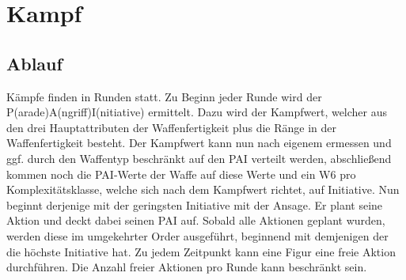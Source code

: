 \documentclass[a4paper,12pt,oneside]{book}
\begin{document}
\part{Kampf}
\setcounter{chapter}{0}
\chapter{Ablauf}

Kämpfe finden in Runden statt. Zu Beginn jeder Runde wird der P(arade)A(ngriff)I(nitiative) ermittelt. Dazu wird der Kampfwert, welcher aus den drei Hauptattributen der Waffenfertigkeit plus die Ränge in der Waffenfertigkeit besteht. Der Kampfwert kann nun nach eigenem ermessen und ggf. durch den Waffentyp beschränkt auf den PAI verteilt werden, abschließend kommen noch die PAI-Werte der Waffe auf diese Werte und ein W6 pro Komplexitätsklasse, welche sich nach dem Kampfwert richtet, auf Initiative. Nun beginnt derjenige mit der geringsten Initiative mit der Ansage. Er plant seine Aktion und deckt dabei seinen PAI auf. Sobald alle Aktionen geplant wurden, werden diese im umgekehrter Order ausgeführt, beginnend mit demjenigen der die höchste Initiative hat. Zu jedem Zeitpunkt kann eine Figur eine freie Aktion durchführen. Die Anzahl freier Aktionen pro Runde kann beschränkt sein.
\end{document}
